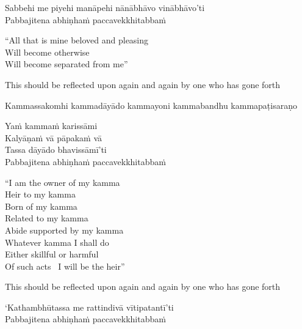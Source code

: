 Sabbehi me piyehi manāpehi nānābhāvo vinābhāvo'ti\\
Pabbajitena abhiṇhaṁ paccavekkhitabbaṁ

\begin{english}
  ``All that is mine beloved and pleasing\\
  Will become otherwise\\
  Will become separated from me''\\
\end{english}

\begin{english-hang}
  This should be reflected upon again and again by one who has gone forth
\end{english-hang}

\begin{pali-hang}
Kammassakomhi kammadāyādo kammayoni kammabandhu kammapaṭisaraṇo\\
\end{pali-hang}
Yaṁ kammaṁ karissāmi\\
Kalyāṇaṁ vā pāpakaṁ vā\\
Tassa dāyādo bhavissāmī'ti\\
Pabbajitena abhiṇhaṁ paccavekkhitabbaṁ

\begin{english}
  ``I am the owner of my kamma\\
  Heir to my kamma\\
  Born of my kamma\\
  Related to my kamma\\
  Abide supported by my kamma\\
  Whatever kamma I shall do\\
  Either skillful or harmful\\
  Of such acts \breathmark\ I will be the heir''\\
\end{english}

\begin{english-hang}
  This should be reflected upon again and again by one who has gone forth
\end{english-hang}

`Kathambhūtassa me rattindivā vītipatantī'ti\\
Pabbajitena abhiṇhaṁ paccavekkhitabbaṁ


